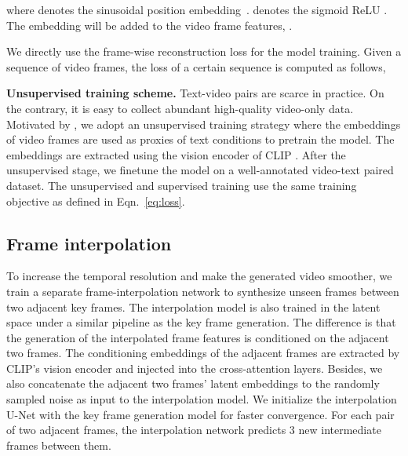 \documentclass[10pt,twocolumn,letterpaper]{article}
\newcommand{\myPara}[1]{\vspace{6pt}\noindent\textbf{#1}}
\begin{document}
where  denotes the sinusoidal position embedding~\cite{vaswani2017attention}.  denotes the sigmoid ReLU \cite{elfwing2018sigmoid}. The embedding  will be added to the video frame features, . 


We directly use the frame-wise reconstruction loss for the model training. Given a sequence of video frames, the loss of a certain sequence is computed as follows, 


\myPara{Unsupervised training scheme.}
\label{subsec:unsupervised_training}
Text-video pairs are scarce in practice. On the contrary, it is easy to collect abundant high-quality   video-only   data. Motivated by \cite{singer_make--video_2022}, we adopt an unsupervised training strategy where the embeddings of video frames are used as proxies of text conditions to pretrain the model. The embeddings are extracted using the vision encoder of CLIP \cite{clip}. After the unsupervised stage, we finetune the model on a  well-annotated video-text paired dataset. The unsupervised and supervised training use the same training objective as defined in Eqn.~\eqref{eq:loss}.

 
\subsection{Frame interpolation}
\label{subsec:interpol}

To increase the temporal resolution and make the generated video smoother, we train a separate frame-interpolation network to synthesize unseen frames between two adjacent key frames. The interpolation model is also trained in the latent space under a similar pipeline as the key frame generation. The difference is that the generation   of the interpolated frame features    is conditioned on the adjacent two frames. The conditioning embeddings of the adjacent frames are extracted by CLIP's vision  encoder and injected into the cross-attention layers. 
Besides, we also concatenate the adjacent two frames' latent embeddings to the randomly sampled noise as input to the interpolation model. 
We initialize the interpolation U-Net  with the key frame generation model for faster convergence. 
For each pair of two adjacent frames, the interpolation network predicts 3 new intermediate frames between them.   
\end{document}
